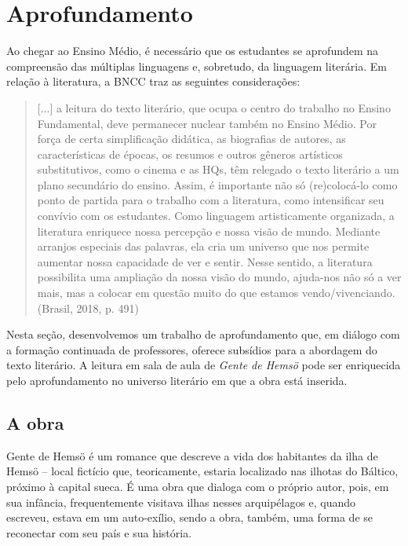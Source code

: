 \documentclass[12pt]{extarticle}
\begin{document}
\section{Aprofundamento}

Ao chegar ao Ensino Médio, é necessário que os estudantes se aprofundem
na compreensão das múltiplas linguagens e, sobretudo, da linguagem
literária. Em relação à literatura, a BNCC traz as seguintes
considerações:

\begin{quote}
{[}...{]} a leitura do texto literário, que ocupa o centro do trabalho
no Ensino Fundamental, deve permanecer nuclear também no Ensino Médio.
Por força de certa simplificação didática, as biografias de autores, as
características de épocas, os resumos e outros gêneros artísticos
substitutivos, como o cinema e as HQs, têm relegado o texto literário a
um plano secundário do ensino. Assim, é importante não só (re)colocá-lo
como ponto de partida para o trabalho com a literatura, como
intensificar seu convívio com os estudantes. Como linguagem
artisticamente organizada, a literatura enriquece nossa percepção e
nossa visão de mundo. Mediante arranjos especiais das palavras, ela cria
um universo que nos permite aumentar nossa capacidade de ver e sentir.
Nesse sentido, a literatura possibilita uma ampliação da nossa visão do
mundo, ajuda-nos não só a ver mais, mas a colocar em questão muito do
que estamos vendo/vivenciando. (Brasil, 2018, p. 491)
\end{quote}

Nesta seção, desenvolvemos um trabalho de aprofundamento que, em diálogo
com a formação continuada de professores, oferece subsídios para a
abordagem do texto literário. A leitura em sala de aula de \emph{Gente
de Hemsö} pode ser enriquecida pelo aprofundamento no universo literário
em que a obra está inserida.

\subsection{A obra}

Gente de Hemsö é um romance que descreve a vida dos habitantes da ilha
de Hemsö -- local fictício que, teoricamente, estaria localizado nas
ilhotas do Báltico, próximo à capital sueca. É uma obra que dialoga com
o próprio autor, pois, em sua infância, frequentemente visitava ilhas
nesses arquipélagos e, quando escreveu, estava em um auto-exílio, sendo
a obra, também, uma forma de se reconectar com seu país e sua história.
\end{document}
